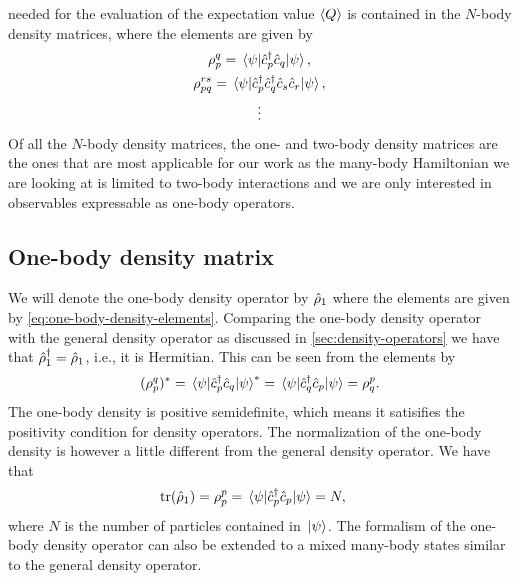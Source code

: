         needed for the evaluation of the expectation value $\expval{Q}$ is
        contained in the $N$-body density matrices, where the elements are given
        by
        \begin{gather}
            \rho^{q}_{p}
            = \mel*{\psi}{\hat{c}_{p}^{\dagger}\hat{c}_{q}}{\psi},
            \label{eq:one-body-density-elements}
            \\
            \rho^{rs}_{pq}
            = \mel*{\psi}{\hat{c}_{p}^{\dagger}\hat{c}_{q}^{\dagger}\hat{c}_{s}\hat{c}_{r}}{\psi},
            \label{eq:two-body-density-elements}
            \\
            \vdots
        \end{gather}
        Of all the $N$-body density matrices, the one- and two-body density
        matrices are the ones that are most applicable for our work as the
        many-body Hamiltonian we are looking at is limited to two-body
        interactions and we are only interested in observables expressable as
        one-body operators.

        \subsection{One-body density matrix}
            We will denote the one-body density operator by $\hat{\rho}_1$ where
            the elements are given by \autoref{eq:one-body-density-elements}.
            Comparing the one-body density operator with the general density
            operator as discussed in \autoref{sec:density-operators} we have
            that $\hat{\rho}^{\dagger}_1 = \hat{\rho}_1$, i.e., it is Hermitian.
            This can be seen from the elements by
            \begin{align}
                (\rho^{q}_{p})^{*}
                = \mel*{\psi}{\hat{c}_{p}^{\dagger}\hat{c}_{q}}{\psi}^{*}
                = \mel*{\psi}{\hat{c}_{q}^{\dagger}\hat{c}_{p}}{\psi}
                = \rho^{p}_{q}.
            \end{align}
            The one-body density is positive semidefinite, which means it
            satisifies the positivity condition for density operators.
            The normalization of the one-body density is however a little
            different from the general density operator.
            We have that
            \begin{align}
                \tr(\hat{\rho}_1)
                &= \rho^{p}_{p}
                = \mel*{\psi}{\hat{c}_{p}^{\dagger}\hat{c}_{p}}{\psi}
                = N,
            \end{align}
            where $N$ is the number of particles contained in $\ket*{\psi}$.
            The formalism of the one-body density operator can also be extended
            to a mixed many-body states similar to the general density operator.

